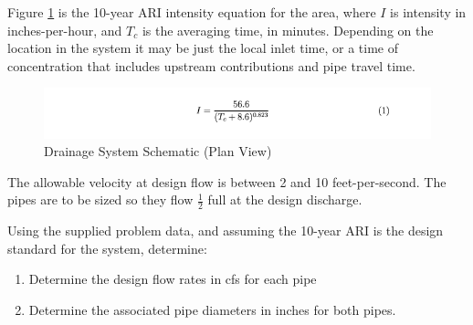 \documentclass[12pt]{article}
\begin{document}
\clearpage

Figure \ref{fig:IDFequation} is the 10-year ARI intensity equation for the area, where $I$ is intensity in inches-per-hour, and $T_c$ is the averaging time, in minutes. Depending on the location in the system it may be just the local inlet time, or a time of concentration that includes upstream contributions and pipe travel time.

\begin{figure}[h!] %
   \centering
   \includegraphics[width=6in]{Eqn1.png} 
   \caption{Drainage System Schematic (Plan View)}
   \label{fig:IDFequation}
\end{figure}

The allowable velocity at design flow is between 2 and 10 feet-per-second. The pipes are to be sized so they flow $\frac{1}{2}$ full at the design discharge.

Using the supplied problem data, and assuming the 10-year ARI is the design standard for the system, determine:

\begin{enumerate}
\item Determine the design flow rates in cfs for each pipe
\item Determine the associated pipe diameters in inches for both pipes.
\end{enumerate}
\end{document}
